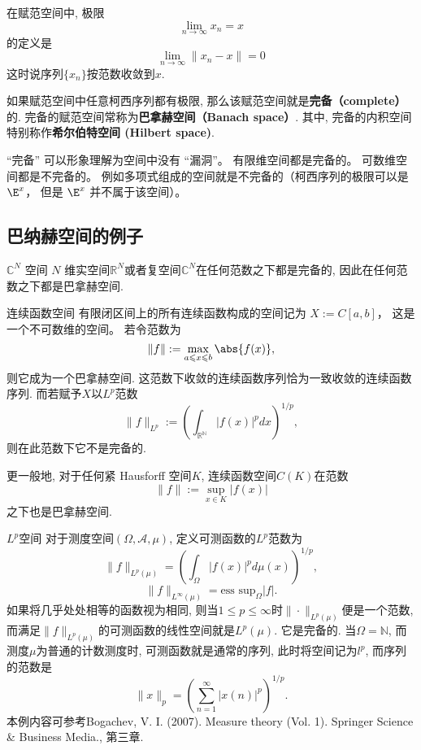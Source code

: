 
在赋范空间中, 极限
\begin{equation}
\lim_{n\to\infty} x_n = x
\end{equation}
的定义是
\begin{equation}
\lim_{n\to\infty} \|{x_n - x}\|= 0
\end{equation}
这时说序列$\{x_n\}$按范数收敛到$x$.

如果赋范空间中任意柯西序列都有极限, 那么该赋范空间就是\textbf{完备（complete）}的. 完备的赋范空间常称为\textbf{巴拿赫空间（Banach space）}. 其中, 完备的内积空间特别称作\textbf{希尔伯特空间 (Hilbert space)}.

“完备” 可以形象理解为空间中没有 “漏洞”。 有限维空间都是完备的。 可数维空间都是不完备的。 例如多项式组成的空间就是不完备的（柯西序列的极限可以是 $\E^x$， 但是 $\E^x$ 并不属于该空间）。

\subsection{巴纳赫空间的例子}
\begin{example}{$\mathbb C^N$ 空间}
$N$ 维实空间$\mathbb R^N$或者复空间$\mathbb C^N$在任何范数之下都是完备的, 因此在任何范数之下都是巴拿赫空间.
\end{example}

\begin{example}{连续函数空间}
有限闭区间上的所有连续函数构成的空间记为 $X := C[a, b]$， 这是一个不可数维的空间。 若令范数为
$$
\|{f}\|:= \max_{a \leqslant x \leqslant b} \abs{f(x)},
$$
则它成为一个巴拿赫空间. 这范数下收敛的连续函数序列恰为一致收敛的连续函数序列. 而若赋予$X$以$L^p$范数
$$
\|f\|_{L^p}:=\left(\int_{\mathbb{R^N}}|f(x)|^pdx\right)^{1/p},
$$
则在此范数下它不是完备的.

更一般地, 对于任何紧 Hausforff 空间$K$, 连续函数空间$C(K)$在范数
$$
\|f\|:=\sup_{x\in K}|f(x)|
$$
之下也是巴拿赫空间.
\end{example}

\begin{example}{$L^p$空间}
对于测度空间$(\Omega,\mathcal{A},\mu)$, 定义可测函数的$L^p$范数为
$$
\|f\|_{L^p(\mu)}=\left(\int_\Omega |f(x)|^pd\mu(x)\right)^{1/p},
$$
$$
\|f\|_{L^\infty(\mu)}=\text{ess sup}_{\Omega}|f|.
$$
如果将几乎处处相等的函数视为相同, 则当$1\leq p\leq\infty$时$\|\cdot\|_{L^p(\mu)}$便是一个范数, 而满足$\|f\|_{L^p(\mu)}$的可测函数的线性空间就是$L^p(\mu)$. 它是完备的. 当$\Omega=\mathbb{N}$, 而测度$\mu$为普通的计数测度时, 可测函数就是通常的序列, 此时将空间记为$l^p$, 而序列的范数是
$$
\|x\|_p=\left(\sum_{n=1}^\infty|x(n)|^p\right)^{1/p}.
$$
本例内容可参考Bogachev, V. I. (2007). Measure theory (Vol. 1). Springer Science \& Business Media., 第三章.
\end{example}


